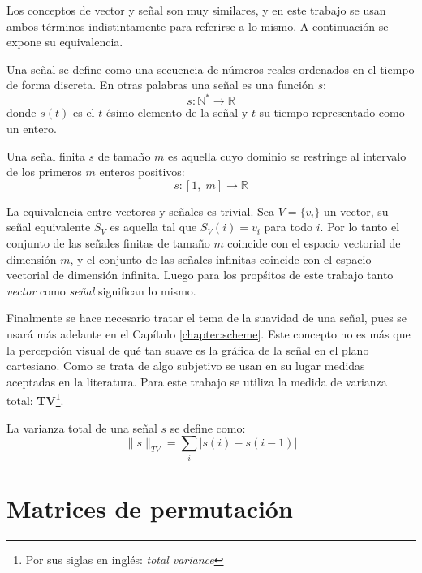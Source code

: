 Los conceptos de vector y señal son muy similares, y en este trabajo se usan ambos t\'erminos indistintamente para referirse a lo mismo. A continuaci\'on se expone su equivalencia.
\begin{definition}
	Una señal se define como una secuencia de n\'umeros reales ordenados en el tiempo de forma discreta. En otras palabras una señal es una función $s$:
	\begin{equation}
		s : \mathbb{N}^\ast \rightarrow \mathbb{R}
	\end{equation}
	donde $s(t)$ es el $t$-\'esimo elemento de la señal y $t$ su tiempo representado como un entero. 
\end{definition}
\begin{definition}
	Una señal finita $s$ de tamaño $m$ es aquella cuyo dominio se restringe al intervalo de los primeros $m$ enteros positivos:
	\begin{equation}
		s : [1,\;m] \rightarrow \mathbb{R}
	\end{equation}
\end{definition}
La equivalencia entre vectores y señales es trivial. Sea $V = \{v_i\}$ un vector, su señal equivalente $S_V$ es aquella tal que $S_V(i) = v_i$ para todo $i$. Por lo tanto el conjunto de las señales finitas de tamaño $m$ coincide con el espacio vectorial de dimensi\'on $m$, y el conjunto de las señales infinitas coincide con el espacio vectorial de dimensi\'on infinita. Luego para los prop\'sitos de este trabajo tanto \textit{vector} como \textit{señal} significan lo mismo.

Finalmente se hace necesario tratar el tema de la suavidad de una señal, pues se usar\'a m\'as adelante en el Cap\'itulo \ref{chapter:scheme}. Este concepto no es m\'as que la percepci\'on visual de qu\'e tan suave es la gr\'afica de la señal en el plano cartesiano. Como se trata de algo subjetivo se usan en su lugar medidas aceptadas en la literatura. Para este trabajo se utiliza la medida de varianza total: \textbf{TV}\footnote{Por sus siglas en ingl\'es: \textit{total variance}}.
\begin{definition}\label{def:tv}
	La varianza total de una señal $s$ se define como:
	\begin{equation}
		\|s\|_{TV} = \sum_{i}|s(i) - s(i - 1)|
	\end{equation}
\end{definition}

\section{Matrices de permutaci\'on}\label{sec:permutation_matrices}


